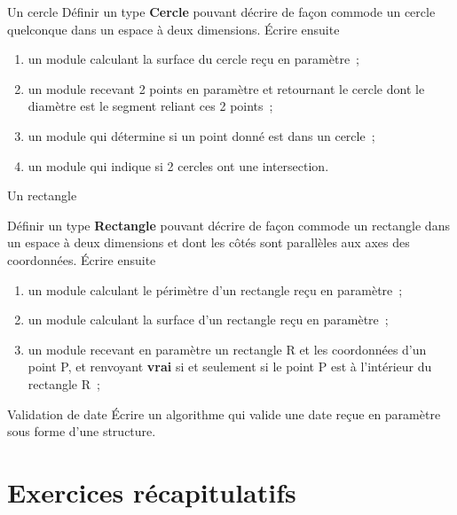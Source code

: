 \begin{Exercice}{Un cercle}
	Définir un type \textbf{Cercle} pouvant décrire de façon
	commode un cercle quelconque dans un espace à deux dimensions. 	
	Écrire ensuite

	\begin{enumerate}[label=\alph*)]
		\item {
			un module calculant la surface du cercle reçu en paramètre~;}
		\item {
				un module recevant 2 points en paramètre et retournant le cercle dont le
			diamètre est le segment reliant ces 2 points~;}
		\item {
			un module qui détermine si un point donné est dans un cercle~;}
		\item {
				un module qui indique si 2 cercles ont une intersection.
			}
	\end{enumerate}
\end{Exercice}


\begin{Exercice}{Un rectangle}

	Définir un type \textbf{Rectangle} pouvant décrire de façon
	commode un rectangle dans un espace à deux dimensions et dont les côtés
	sont parallèles aux axes des coordonnées. 	
	Écrire ensuite

	\begin{enumerate}[label=\alph*)]
		\item {
			un module calculant le périmètre d’un rectangle reçu en paramètre~;}
		\item {
			un module calculant la surface d’un rectangle reçu en paramètre~;}
		\item {
				un module recevant en paramètre un rectangle R et les coordonnées
				d’un point P, et renvoyant 
				\textbf{vrai} si et seulement si le point P est à
			l’intérieur du rectangle R~;}
	\end{enumerate}
\end{Exercice}

\begin{Exercice}{Validation de date}
	Écrire un algorithme qui valide une date reçue en paramètre 
	sous forme d’une structure.
\end{Exercice}





\section{Exercices récapitulatifs}

